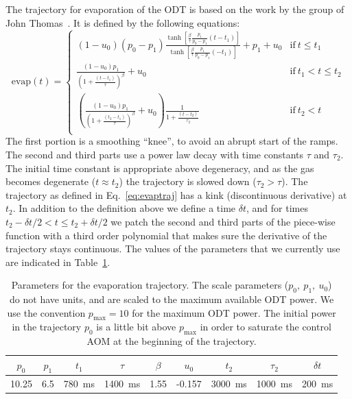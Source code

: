 The trajectory for evaporation of the ODT is based on the work by the group of
John Thomas~\cite{OHara2001PRAb,Luo2006}.  It is defined by the following
equations:
\begin{equation}
\text{evap}(t) = 
  \begin{cases}  
   (1-u_{0})     (p_{0}-p_{1})\frac{\tanh \left[\frac{\beta }{\tau
}\frac{p_{1}}{p_{0}-p_{1}} (t-t_{1})\right]}{\tanh\left[\frac{\beta }{\tau
}\frac{p_{1}}{p_{0}-p_{1}}(-t_{1})\right]}+p_{1} +u_{0} 
%
  & \text{if}\ t \leq t_{1} \\ 
   \frac{(1-u_{0})p_{1}}
     {\left(1+\frac{(t-t_{1})}{\tau }\right)^{\beta }} + u_{0}
  &  \text{if}\  t_{1}  < t \leq t_{2} \\
%
   \left(\frac{(1-u_{0})p_{1}}{\left(1+\frac{(t_{2}-t_{1})}{\tau }\right)^{\beta
}}+u_{0}\right)\frac{1}{1+\frac{(t-t_{2})}{\tau_{2}}}
   &   \text{if}\  t_{2}  < t \\
  \end{cases}
\label{eq:evaptraj}
\end{equation}
The first portion is a smoothing ``knee'', to avoid an abrupt start of the
ramps.  The second and third parts use a power law decay with time constants
$\tau$ and $\tau_{2}$.  The initial time constant is appropriate above
degeneracy, and as the gas becomes degenerate ($t\approx t_{2}$) the trajectory
is slowed down ($\tau_{2} > \tau$).  The  trajectory as defined in
Eq.~\ref{eq:evaptraj} has a kink (discontinuous derivative) at $t_{2}$. In
addition to the definition above  we define a time $\delta t$, and for times
$t_{2}
- \delta t/2 < t \leq t_{2} + \delta t/2$ we patch the second and third parts
  of the piece-wise function with a third order polynomial that makes sure the
derivative of the trajectory stays continuous.  The values of the parameters
that we currently use are indicated in Table~\ref{tab:evap}.

\begin{table}
\vspace{0.1em}
\begin{center}
 \begin{tabular}{c|c|c|c|c|c|c|c|c|}
$p_{0}$ &  
$p_{1}$ &  
$t_{1}$ &  
$\tau$  &   
$\beta$ &  
$u_{0}$ &  
$t_{2}$ &  
$\tau_{2}$  &
$\delta t$ 
  \\ \hline
 10.25 & 
 6.5   &
 780~ms  &  
 1400~ms &  
 1.55   & 
 -0.157 & 
 3000~ms  & 
  1000~ms &
 200~ms   
\end{tabular}
\end{center}
\caption{Parameters for the evaporation trajectory.  The scale parameters
($p_{0},\ p_{1},\ u_{0}$) do not have units, and are scaled to the maximum
available ODT power.  We use the convention $p_{\text{max}}=10$ for the maximum
ODT power. The initial power in the trajectory $p_{0}$ is a little bit above
$p_{\text{max}}$ in order to saturate the control AOM at the beginning of the
trajectory. }
\label{tab:evap}
\end{table}

